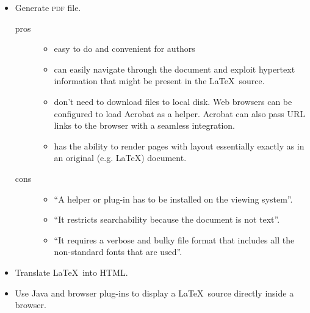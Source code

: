\documentclass[landscape, headrule, footrule]{foils}
\begin{document}
\begin{itemize}
  \item Generate \textsc{pdf} file. 
    \begin{description}
      \item[pros] \quad
\begin{itemize}
  \item easy to do and convenient for authors
  \item can easily navigate through the document and exploit hypertext information that might be
present in the \LaTeX\, source.
  \item don't need to download files to local disk.
  Web browsers can be configured to load Acrobat as a helper. Acrobat can also pass URL links to
the browser with a seamless integration.
  \item has the ability to render pages with layout essentially exactly as in an original 
(e.g. \LaTeX) document.
\end{itemize}
      \item[cons]\quad
\begin{itemize}
  \item ``A helper or plug-in has to be installed on the viewing system''.
  \item ``It restricts searchability because the document is not text''. 
  \item ``It requires a verbose and bulky file format that includes all the non-standard 
fonts that are used''\cite{GoossensEtAl:1999}.
\end{itemize}
    \end{description}
\end{itemize}


\begin{itemize}
  \item Translate \LaTeX\, into HTML.
  \item Use Java and browser plug-ins to display a \LaTeX\, source directly inside a browser. 
\end{itemize}
\end{document}

